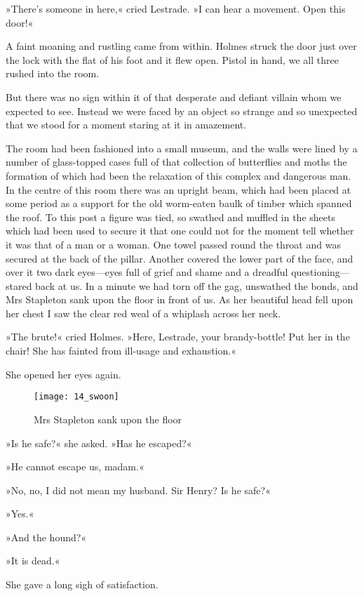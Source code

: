 »There's someone in here,« cried Lestrade. »I can hear a movement. Open this door!«

A faint moaning and rustling came from within. Holmes struck the door just over the lock with the flat of his foot and it flew open. Pistol in hand, we all three rushed into the room.

But there was no sign within it of that desperate and defiant villain whom we expected to see. Instead we were faced by an object so strange and so unexpected that we stood for a moment staring at it in amazement.

The room had been fashioned into a small museum, and the walls were lined by a number of glass-topped cases full of that collection of butterflies and moths the formation of which had been the relaxation of this complex and dangerous man. In the centre of this room there was an upright beam, which had been placed at some period as a support for the old worm-eaten baulk of timber which spanned the roof. To this post a figure was tied, so swathed and muffled in the sheets which had been used to secure it that one could not for the moment tell whether it was that of a man or a woman. One towel passed round the throat and was secured at the back of the pillar. Another covered the lower part of the face, and over it two dark eyes—eyes full of grief and shame and a dreadful questioning—stared back at us. In a minute we had torn off the gag, unswathed the bonds, and Mrs Stapleton sank upon the floor in front of us. As her beautiful head fell upon her chest I saw the clear red weal of a whiplash across her neck.

»The brute!« cried Holmes. »Here, Lestrade, your brandy-bottle! Put her in the chair! She has fainted from ill-usage and exhaustion.«

She opened her eyes again.

\begin{figure}[tbph]
\centering
\texttt{[image: 14\_swoon]}
\caption{Mrs Stapleton sank upon the floor}
\end{figure}

»Is he safe?« she asked. »Has he escaped?«

»He cannot escape us, madam.«

»No, no, I did not mean my husband. Sir Henry? Is he safe?«

»Yes.«

»And the hound?«

»It is dead.«

She gave a long sigh of satisfaction.

